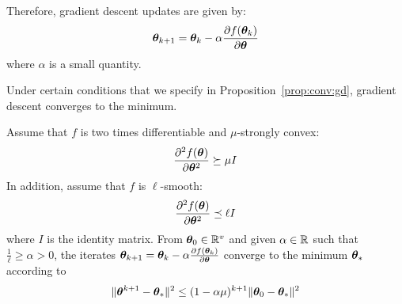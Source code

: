 Therefore, gradient descent updates are given by:
\begin{align}
  \thetab_{k+1} = \thetab_k -\alpha \partialfrac{\thetab}{f(\thetab_k)} \label{eq:update:gd}
\end{align}
where $\alpha$ is a small quantity.

Under certain conditions that we specify in Proposition~\ref{prop:conv:gd},
gradient descent converges to the minimum.

\begin{proposition}
  \label{prop:conv:gd}
  Assume that $f$ is two times differentiable and $\mu$-strongly convex:
  \begin{equation}
    \partialfrac{\thetab^2}{^2f(\thetab)} \succeq \mu I
  \end{equation}
  In addition, assume that $f$ is $\ell$-smooth:
  \begin{equation}
    \partialfrac{\thetab^2}{^2f(\thetab)} \preceq \ell I
  \end{equation}
  where $I$ is the identity matrix.
  From $\thetab_0 \in \RR^v$ and given $\alpha \in \RR$ such that $\frac1{\ell} \geq \alpha > 0$, the iterates
  $\thetab_{k+1} = \thetab_k -\alpha \partialfrac{\thetab}{f(\thetab_k)}$ converge to the
  minimum $\thetab_*$ according to
  \begin{equation}
    \| \thetab^{k+1} - \thetab_* \|^2 \leq (1 - \alpha \mu)^{k + 1} \| \thetab_0 - \thetab_* \|^2
  \end{equation}
\end{proposition}
